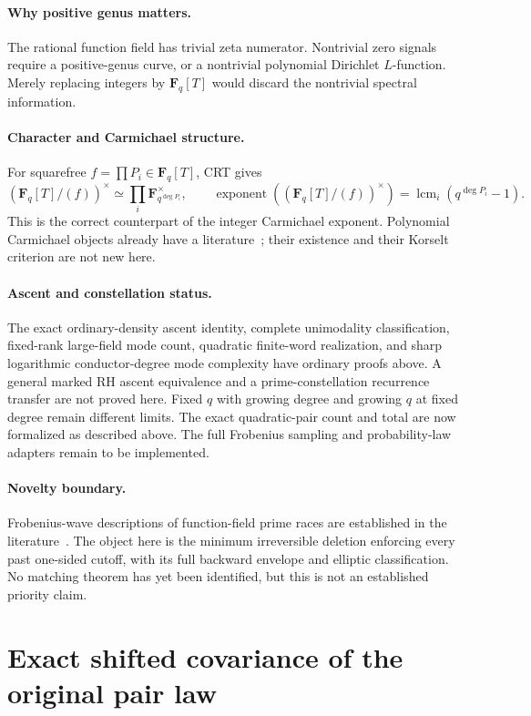 \documentclass[11pt]{article}
\newcommand{\F}{\mathbf F}
\begin{document}
\paragraph{Why positive genus matters.}
The rational function field has trivial zeta numerator. Nontrivial
zero signals require a positive-genus curve, or a nontrivial polynomial
Dirichlet \(L\)-function. Merely replacing integers by \(\F_q[T]\)
would discard the nontrivial spectral information.

\paragraph{Character and Carmichael structure.}
For squarefree \(f=\prod P_i\in\F_q[T]\), CRT gives
\[
 (\F_q[T]/(f))^\times\simeq
 \prod_i\F_{q^{\deg P_i}}^\times,\qquad
 \operatorname{exponent}((\F_q[T]/(f))^\times)
       =\operatorname{lcm}_i(q^{\deg P_i}-1).
\]
This is the correct counterpart of the integer Carmichael exponent.
Polynomial Carmichael objects already have a literature~\cite{BaeHuSha};
their existence and their Korselt criterion are not new here.

\paragraph{Ascent and constellation status.}
The exact ordinary-density ascent identity, complete unimodality
classification, fixed-rank large-field mode count, quadratic finite-word
realization, and sharp logarithmic conductor-degree mode complexity
have ordinary proofs above. A general marked RH ascent equivalence
and a prime-constellation recurrence transfer are not proved here.
Fixed \(q\) with growing degree and growing \(q\) at fixed degree remain
different limits. The exact quadratic-pair count and total are now
formalized as described above. The full Frobenius sampling and
probability-law adapters remain to be implemented.

\paragraph{Novelty boundary.}
Frobenius-wave descriptions of function-field prime races are established
in the literature~\cite{CFJ,BDKL}. The object here is the minimum irreversible
deletion enforcing every past one-sided cutoff, with its full backward
envelope and elliptic classification. No matching theorem has yet been
identified, but this is not an established priority claim.

\section{Exact shifted covariance of the original pair law}
\label{sec:raw-pair-covariance}
\end{document}

